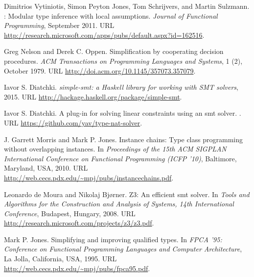 \documentclass{sigplanconf}
\begin{document}
\begin{thebibliography}{}
\balance

{Dimitrios Vytiniotis}, {Simon Peyton Jones}, {Tom Schrijvers}, and {Martin
  Sulzmann}.
: Modular type inference with local assumptions.
\newblock \emph{Journal of Functional Programming}, September 2011.
\newblock URL
  \url{http://research.microsoft.com/apps/pubs/default.aspx?id=162516}.

{Greg Nelson} and {Derek C. Oppen}.
\newblock Simplification by cooperating decision procedures.
\newblock \emph{ACM Transactions on Programming Languages and Systems},
  1 (2), October 1979.
\newblock URL \url{http://doi.acm.org/10.1145/357073.357079}.

{Iavor S. Diatchki}.
\newblock \emph{simple-smt: a {Haskell} library for working with SMT solvers},
  2015{}.
\newblock URL \url{http://hackage.haskell.org/package/simple-smt}.

{Iavor S. Diatchki}.
\newblock A plug-in for solving linear constraints using an smt solver.
.
\newblock URL \url{https://github.com/yav/type-nat-solver}.

{J. Garrett Morris} and {Mark P. Jones}.
\newblock Instance chains: Type class programming without overlapping
  instances.
\newblock In \emph{Proceedings of the 15th ACM SIGPLAN International Conference
  on Functional Programming (ICFP '10)}, Baltimore, Maryland, USA, 2010.
\newblock URL \url{http://web.cecs.pdx.edu/~mpj/pubs/instancechains.pdf}.

{Leonardo de Moura} and {Nikolaj Bjørner}.
\newblock Z3: An efficient smt solver.
\newblock In \emph{Tools and Algorithms for the Construction and Analysis of
  Systems, 14th International Conference}, Budapest, Hungary, 2008.
\newblock URL \url{http://research.microsoft.com/projects/z3/z3.pdf}.

{Mark P. Jones}.
\newblock Simplifying and improving qualified types.
\newblock In \emph{FPCA '95: Conference on Functional Programming Languages and
  Computer Architecture}, La Jolla, California, USA, 1995.
\newblock URL \url{http://web.cecs.pdx.edu/~mpj/pubs/fpca95.pdf}.


\end{thebibliography}
\end{document}
